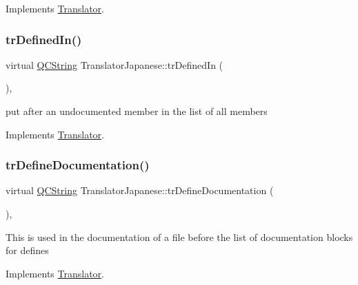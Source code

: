 Implements \mbox{\hyperlink{class_translator}{Translator}}.

\mbox{\label{class_translator_japanese_ac6b129846bb438195e46847a70e7695c}} 
\subsubsection{\texorpdfstring{trDefinedIn()}{trDefinedIn()}}
{\footnotesize\ttfamily virtual \mbox{\hyperlink{class_q_c_string}{Q\+C\+String}} Translator\+Japanese\+::tr\+Defined\+In (\begin{DoxyParamCaption}{ }\end{DoxyParamCaption})\hspace{0.3cm}{\ttfamily [inline]}, {\ttfamily [virtual]}}

put after an undocumented member in the list of all members 

Implements \mbox{\hyperlink{class_translator}{Translator}}.

\mbox{\label{class_translator_japanese_a86e9f53fcbfd24cd8849d51fe935ad67}} 
\subsubsection{\texorpdfstring{trDefineDocumentation()}{trDefineDocumentation()}}
{\footnotesize\ttfamily virtual \mbox{\hyperlink{class_q_c_string}{Q\+C\+String}} Translator\+Japanese\+::tr\+Define\+Documentation (\begin{DoxyParamCaption}{ }\end{DoxyParamCaption})\hspace{0.3cm}{\ttfamily [inline]}, {\ttfamily [virtual]}}

This is used in the documentation of a file before the list of documentation blocks for defines 

Implements \mbox{\hyperlink{class_translator}{Translator}}.

\mbox{\label{class_translator_japanese_a062913f0a85a43d682f437104db04189}} 
